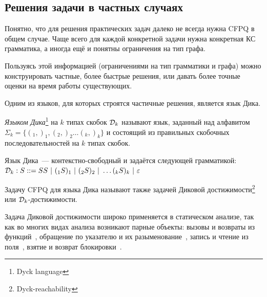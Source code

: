\subsection{Решения задачи в частных случаях}

Понятно, что для решения практических задач далеко не всегда нужна CFPQ в общем случае. Чаще всего для каждой конкретной задачи нужна конкретная КС грамматика, а иногда ещё и понятны ограничения на тип графа.

Пользуясь этой информацией (ограничениями на тип грамматики и графа) можно конструировать частные, более быстрые решения, или давать более точные оценки на время работы существующих. 

Одним из языков, для которых строятся частичные решения, является язык Дика.

\begin{definition}\label{def:dyck}
  \textit{Языком Дика}\footnote{Dyck language} на $k$ типах скобок $\mathcal{D}_k$ называют язык, заданный над алфавитом $\Sigma_k = \{ (_1, )_1, (_2, )_2 \dots (_k, )_k \}$ и состоящий из правильных скобочных последовательностей на $k$ типах скобок.

  Язык Дика~--- контекстно-свободный и задаётся следующей грамматикой:\\ $\mathcal{D}_k : S ::= S S~|~(_1 S )_1 ~|~ (_2 S )_2~|~ \dots (_k S )_k ~|~ \varepsilon$

\end{definition}

\begin{definition}\label{def:dyck_reach}
  Задачу CFPQ для языка Дика называют также задачей Диковой достижимости\footnote{Dyck-reachability}~\cite{Kodumal04} или $\mathcal{D}_k$-достижимости.
\end{definition}

Задача Диковой достижимости широко применяется в статическом анализе, так как во многих видах анализа возникают парные объекты: вызовы и возвраты из функций~\cite{Tang15}, обращение по указателю и их разыменование~\cite{Zheng08}, запись и чтение из поля~\cite{Yan11}, взятие и возврат блокировки~\cite{Kahlon09}.



